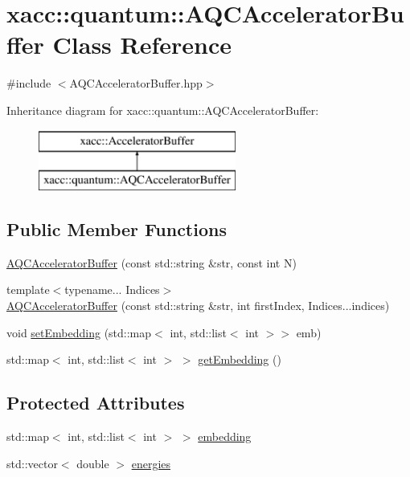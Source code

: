 \hypertarget{a00016}{}\section{xacc\+:\+:quantum\+:\+:A\+Q\+C\+Accelerator\+Buffer Class Reference}
\label{a00016}


{\ttfamily \#include $<$A\+Q\+C\+Accelerator\+Buffer.\+hpp$>$}

Inheritance diagram for xacc\+:\+:quantum\+:\+:A\+Q\+C\+Accelerator\+Buffer\+:\begin{figure}[H]
\begin{center}
\leavevmode
\includegraphics[height=2.000000cm]{a00016}
\end{center}
\end{figure}
\subsection*{Public Member Functions}
\begin{DoxyCompactItemize}
\item 
\hyperlink{a00016_ac2f9ea58140a27741b4dc8fceaa1ca5c}{A\+Q\+C\+Accelerator\+Buffer} (const std\+::string \&str, const int N)
\item 
{\footnotesize template$<$typename... Indices$>$ }\\\hyperlink{a00016_a628c742acf1d20fc8fe9b69f9be7b2c6}{A\+Q\+C\+Accelerator\+Buffer} (const std\+::string \&str, int first\+Index, Indices...\+indices)
\item 
void \hyperlink{a00016_a23992d11bdb6f093c0ce3f743677d4d9}{set\+Embedding} (std\+::map$<$ int, std\+::list$<$ int $>$$>$ emb)
\item 
std\+::map$<$ int, std\+::list$<$ int $>$ $>$ \hyperlink{a00016_ae98155c023d1b31b3b55a8c8e4ec6bc6}{get\+Embedding} ()
\end{DoxyCompactItemize}
\subsection*{Protected Attributes}
\begin{DoxyCompactItemize}
\item 
std\+::map$<$ int, std\+::list$<$ int $>$ $>$ \hyperlink{a00016_a26fd739244b0346cc3398eef31b11264}{embedding}
\item 
std\+::vector$<$ double $>$ \hyperlink{a00016_abe6d781724e197df449d8dfcde60e1a4}{energies}
\end{DoxyCompactItemize}


